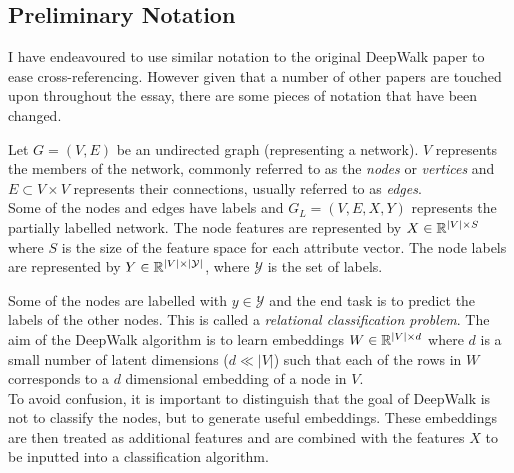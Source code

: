 \documentclass[a4paper]{article}
\begin{document}
\subsection{Preliminary Notation}
I have endeavoured to use similar notation to the original DeepWalk paper to ease
cross-referencing. However given that a number of other papers are touched upon
throughout the essay, there are some pieces of notation that have been changed.

\begin{definition}
  Let $G = (V, E)$ be an undirected graph (representing a network). $V$ represents the
  members of the network, commonly referred to as the \textit{nodes} or \textit{vertices} and $E \subset V
  \times V$ represents their connections, usually referred to as
  \textit{edges}.\\
  Some of the nodes and edges have labels and $G_L = (V, E, X, Y)$ represents the
  partially labelled network. The node features are represented by $X \in \R^{|V| \times S}$ where $S$ is the size of
  the feature space for each attribute vector. The node labels are represented by $Y \in \R^{|V|
    \times|\mathcal{Y}|}$, where $\mathcal{Y}$ is the set of labels.
\end{definition}
Some of the nodes are labelled with $y \in \mathcal{Y}$ and the end task is to
predict the labels of the other nodes. This is called a \textit{relational
  classification problem}. The aim of the DeepWalk algorithm is to learn embeddings $W \in \R^{|V| \times d}$ where $d$ is a small number
of latent dimensions ($d \ll |V|$) such that each of the rows in $W$
corresponds to a $d$ dimensional embedding of a node in $V$.\\
To avoid confusion, it is important to distinguish that the goal of DeepWalk is
not to classify the nodes, but to generate useful embeddings. These embeddings
are then treated as additional features and are combined with the features $X$
to be inputted into a classification algorithm.
\end{document}
